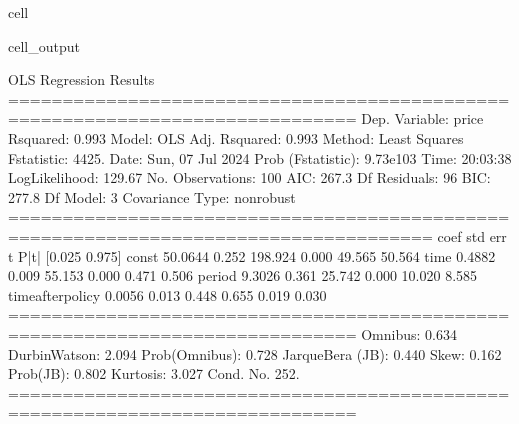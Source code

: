 \documentclass[letterpaper,10pt,english]{jupyterBook}
\begin{document}
\begin{sphinxuseclass}{cell}
\begin{sphinxVerbatimOutput}
\begin{sphinxuseclass}{cell_output}
\begin{sphinxVerbatim}[commandchars=\\\{\}]
                            OLS Regression Results                            
==============================================================================
Dep. Variable:                  price   R\PYGZhy{}squared:                       0.993
Model:                            OLS   Adj. R\PYGZhy{}squared:                  0.993
Method:                 Least Squares   F\PYGZhy{}statistic:                     4425.
Date:                Sun, 07 Jul 2024   Prob (F\PYGZhy{}statistic):          9.73e\PYGZhy{}103
Time:                        20:03:38   Log\PYGZhy{}Likelihood:                \PYGZhy{}129.67
No. Observations:                 100   AIC:                             267.3
Df Residuals:                      96   BIC:                             277.8
Df Model:                           3                                         
Covariance Type:            nonrobust                                         
=====================================================================================
                        coef    std err          t      P\PYGZgt{}|t|      [0.025      0.975]
\PYGZhy{}\PYGZhy{}\PYGZhy{}\PYGZhy{}\PYGZhy{}\PYGZhy{}\PYGZhy{}\PYGZhy{}\PYGZhy{}\PYGZhy{}\PYGZhy{}\PYGZhy{}\PYGZhy{}\PYGZhy{}\PYGZhy{}\PYGZhy{}\PYGZhy{}\PYGZhy{}\PYGZhy{}\PYGZhy{}\PYGZhy{}\PYGZhy{}\PYGZhy{}\PYGZhy{}\PYGZhy{}\PYGZhy{}\PYGZhy{}\PYGZhy{}\PYGZhy{}\PYGZhy{}\PYGZhy{}\PYGZhy{}\PYGZhy{}\PYGZhy{}\PYGZhy{}\PYGZhy{}\PYGZhy{}\PYGZhy{}\PYGZhy{}\PYGZhy{}\PYGZhy{}\PYGZhy{}\PYGZhy{}\PYGZhy{}\PYGZhy{}\PYGZhy{}\PYGZhy{}\PYGZhy{}\PYGZhy{}\PYGZhy{}\PYGZhy{}\PYGZhy{}\PYGZhy{}\PYGZhy{}\PYGZhy{}\PYGZhy{}\PYGZhy{}\PYGZhy{}\PYGZhy{}\PYGZhy{}\PYGZhy{}\PYGZhy{}\PYGZhy{}\PYGZhy{}\PYGZhy{}\PYGZhy{}\PYGZhy{}\PYGZhy{}\PYGZhy{}\PYGZhy{}\PYGZhy{}\PYGZhy{}\PYGZhy{}\PYGZhy{}\PYGZhy{}\PYGZhy{}\PYGZhy{}\PYGZhy{}\PYGZhy{}\PYGZhy{}\PYGZhy{}\PYGZhy{}\PYGZhy{}\PYGZhy{}\PYGZhy{}
const                50.0644      0.252    198.924      0.000      49.565      50.564
time                  0.4882      0.009     55.153      0.000       0.471       0.506
period               \PYGZhy{}9.3026      0.361    \PYGZhy{}25.742      0.000     \PYGZhy{}10.020      \PYGZhy{}8.585
time\PYGZus{}after\PYGZus{}policy     0.0056      0.013      0.448      0.655      \PYGZhy{}0.019       0.030
==============================================================================
Omnibus:                        0.634   Durbin\PYGZhy{}Watson:                   2.094
Prob(Omnibus):                  0.728   Jarque\PYGZhy{}Bera (JB):                0.440
Skew:                          \PYGZhy{}0.162   Prob(JB):                        0.802
Kurtosis:                       3.027   Cond. No.                         252.
==============================================================================


\end{sphinxVerbatim}
\end{sphinxuseclass}
\end{sphinxVerbatimOutput}
\end{sphinxuseclass}
\end{document}
